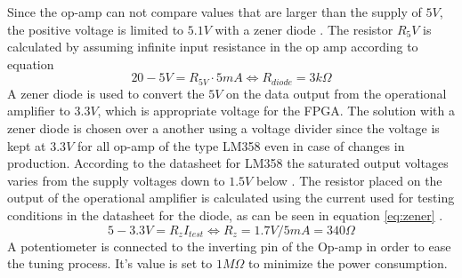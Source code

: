 Since the op-amp can not compare values that are larger than the supply of $5V$, the positive voltage is limited to $5.1V$ with a zener diode \cite{zener}. The resistor $R_5V$ is calculated by assuming infinite input resistance in the op amp according to equation 
\begin{equation}
20 - 5 V = R_{5V} \cdot 5mA \Leftrightarrow R_{diode} = 3\si{k\Omega} 
\label{eq:zener5VResistor}
\end{equation}
A zener diode \cite{zener} is used to convert the $5V$ on the data output from the operational amplifier to $3.3V$, which is appropriate voltage for the FPGA. The solution with a zener diode is chosen over a another using a voltage divider since the voltage is kept at $3.3V$ for all op-amp of the type LM358 even in case of changes in production. According to the datasheet for LM358 the saturated output voltages varies from the supply voltages down to $1.5V$ below \cite{lm358}.
The resistor placed on the output of the operational amplifier is calculated using the current used for testing conditions in the datasheet for the diode, as can be seen in equation \ref{eq:zener} \cite{zener}.
\begin{equation}
5-3.3V = R_{z} I_{test} \Leftrightarrow R_{z} = 1.7V/5mA = 340\Omega
\label{eq:zener}
\end{equation}
% 
A potentiometer is connected to the inverting pin of the Op-amp in order to ease the tuning process. It's value is set to $1\si{M\Omega}$ to minimize the power consumption.